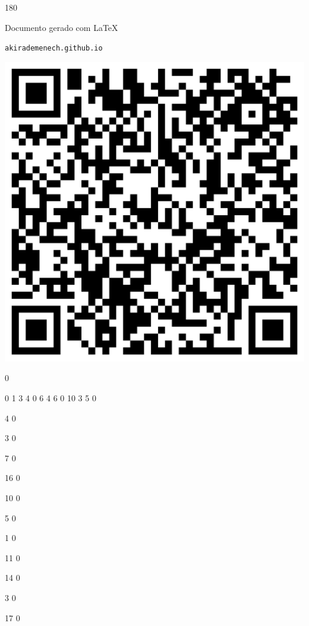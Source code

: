 \documentclass[12pt]{article}
\begin{document}
	\begin{turn}{180}	
		\begin{minipage}{\textwidth}		  
		  Documento gerado com \LaTeX			
		  
		  \texttt{akirademenech.github.io}

		  \includegraphics[height=0.3\textheight]{2e-2.pdf}

		\end{minipage}	
	\end{turn}  
		  
		\vfill  
		  
{
	0	%

	0	%
	1	%
	3	%
	4	%
	0	%
	6	%
	4	%
	6	%
	0	%
	10	%
	3	%
	5	%
	0	%

	4	%
	0	%

	3	%
	0	%

	7	%
	0	%

	16	%
	0	%

	10	%
	0	%

	5	%
	0	%

	1	%
	0	%

	11	%
	0	%

	14	%
	0	%

	3	%
	0	%

	17	%
	0	%

}	  
		    	
\end{document}
